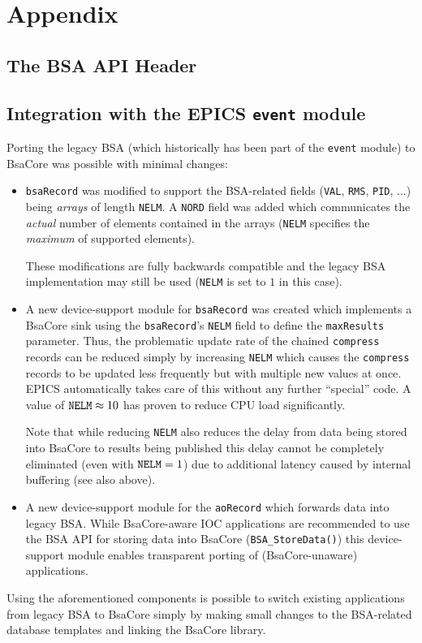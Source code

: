 \documentclass[11pt]{article}
\newcommand{\bsac}{BsaCore}
\newcommand{\bsa} {BSA}
\newcommand{\cod}[1]{{\tt#1}}
\begin{document}
\section*{Appendix}

\subsection*{The \bsa{} API Header}
\label{app:api}

\subsection*{Integration with the EPICS \cod{event} module}
Porting the legacy \bsa{} (which historically has been part of
the \cod{event} module) to \bsac{} was possible with minimal
changes:
\begin{itemize}
\item \cod{bsaRecord} was modified to support the \bsa{}-related fields
      (\cod{VAL}, \cod{RMS}, \cod{PID}, ...) being {\em arrays} of length
      \cod{NELM}. A \cod{NORD} field was added which communicates the
      {\em actual} number of elements contained in the arrays (\cod{NELM}
      specifies the {\em maximum} of supported elements).

      These modifications are fully backwards compatible and the legacy
      \bsa{} implementation may still be used (\cod{NELM} is set to $1$
      in this case).

\item A new device-support module for \cod{bsaRecord} was created which
      implements a \bsac{} sink using the \cod{bsaRecord}'s \cod{NELM}
      field to define the \cod{maxResults} parameter. Thus, the problematic
      update rate of the chained \cod{compress} records can be reduced
      simply by increasing \cod{NELM} which causes the \cod{compress}
      records to be updated less frequently but with multiple new values
      at once. EPICS automatically takes care of this without any further
      ``special'' code. A value of $\cod{NELM} \approx 10$ has proven to
      reduce CPU load significantly.

      Note that while reducing \cod{NELM} also reduces the delay from data
      being stored into \bsac{} to results being published this delay cannot
      be completely eliminated (even with $\cod{NELM} = 1$) due to additional
      latency caused by internal buffering (see also above).

\item A new device-support module for the \cod{aoRecord} which forwards
      data into legacy \bsa{}. While \bsac{}-aware IOC applications are
      recommended to use the \bsa{} API for storing data into \bsac{}
      (\cod{BSA\_StoreData()}) this device-support module enables transparent
      porting of (\bsac{}-unaware) applications.
\end{itemize}
Using the aforementioned components is possible to switch existing applications
from legacy \bsa{} to \bsac{} simply by making small changes to the \bsa{}-related
database templates and linking the \bsac{} library.
\end{document}
